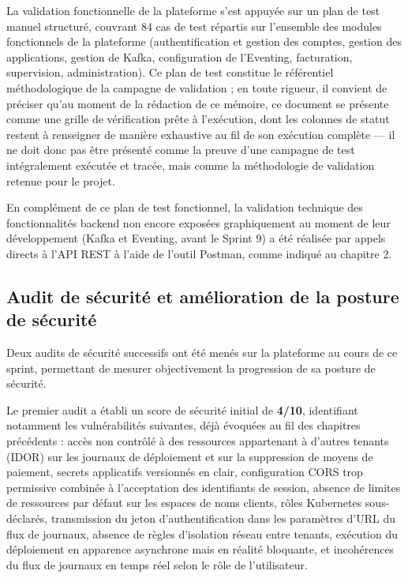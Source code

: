 La validation fonctionnelle de la plateforme s'est appuyée sur un plan de test manuel structuré, couvrant 84 cas de test répartis sur l'ensemble des modules fonctionnels de la plateforme (authentification et gestion des comptes, gestion des applications, gestion de Kafka, configuration de l'Eventing, facturation, supervision, administration). Ce plan de test constitue le référentiel méthodologique de la campagne de validation ; en toute rigueur, il convient de préciser qu'au moment de la rédaction de ce mémoire, ce document se présente comme une grille de vérification prête à l'exécution, dont les colonnes de statut restent à renseigner de manière exhaustive au fil de son exécution complète — il ne doit donc pas être présenté comme la preuve d'une campagne de test intégralement exécutée et tracée, mais comme la méthodologie de validation retenue pour le projet.

En complément de ce plan de test fonctionnel, la validation technique des fonctionnalités backend non encore exposées graphiquement au moment de leur développement (Kafka et Eventing, avant le Sprint 9) a été réalisée par appels directs à l'API REST à l'aide de l'outil Postman, comme indiqué au chapitre 2.

\subsection{Audit de sécurité et amélioration de la posture de sécurité}

Deux audits de sécurité successifs ont été menés sur la plateforme au cours de ce sprint, permettant de mesurer objectivement la progression de sa posture de sécurité.

Le premier audit a établi un score de sécurité initial de \textbf{4/10}, identifiant notamment les vulnérabilités suivantes, déjà évoquées au fil des chapitres précédents : accès non contrôlé à des ressources appartenant à d'autres tenants (IDOR) sur les journaux de déploiement et sur la suppression de moyens de paiement, secrets applicatifs versionnés en clair, configuration CORS trop permissive combinée à l'acceptation des identifiants de session, absence de limites de ressources par défaut sur les espaces de noms clients, rôles Kubernetes sous-déclarés, transmission du jeton d'authentification dans les paramètres d'URL du flux de journaux, absence de règles d'isolation réseau entre tenants, exécution du déploiement en apparence asynchrone mais en réalité bloquante, et incohérences du flux de journaux en temps réel selon le rôle de l'utilisateur.

